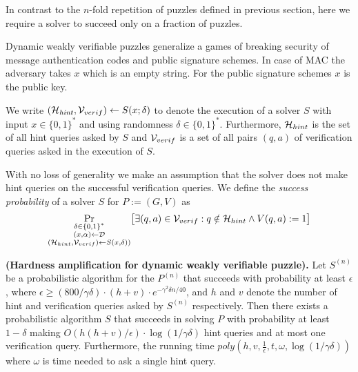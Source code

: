 In contrast to the $n$-fold repetition of puzzles defined in previous section, here we
require a solver to succeed only on a fraction of puzzles.

Dynamic weakly verifiable puzzles generalize a games of breaking security of message authentication codes and public signature schemes.
In case of MAC the adversary takes $x$ which is an empty string. For the public signature schemes $x$ is the public key.

We write $(\mathcal{H}_{\mathit{hint}}, \mathcal{V}_{verif}) \leftarrow S(x; \delta)$
to denote the execution of a solver $S$ with input $x \in \{0,1\}^{*}$ and using randomness $\delta \in \{0,1\}^{*}$.
Furthermore, $\mathcal{H}_{hint}$ is the set of all hint queries asked by $S$ and $\mathcal{V}_{verif}$ is
a set of all pairs $(q,a)$ of verification queries asked in the execution of $S$.

With no loss of generality we make an assumption that the solver does not make
hint queries on the successful verification queries.
We define the \textit{success probability} of a solver $S$ for $P := (G,V)$ as
\begin{align*}
  \underset{\substack{\delta \in \{0,1\}^{*} \\(x,\alpha) \leftarrow \mathcal{D} \\ (\mathcal{H}_{hint}, \mathcal{V}_{verif}) \leftarrow S(x,\delta))}}
  {\Pr}\big[\exists (q,a) \in \mathcal{V}_{verif} : q \notin \mathcal{H}_{hint} \land V(q,a) := 1 \big]
\end{align*}

\begin{theorem}\textbf{(Hardness amplification for dynamic weakly verifiable puzzle).}
\label{lemma:dwvp}
Let $S^{(n)}$ be a probabilistic algorithm for the $P^{(n)}$ that succeeds with
probability at least $\epsilon$, where $\epsilon \geq (800/\gamma\delta) \cdot (h+v) \cdot e^{-\gamma^2\delta n/40}$, and $h$ and $v$
denote the number of hint and verification queries asked by $S^{(n)}$ respectively.
Then there exists a probabilistic algorithm $S$ that succeeds in solving $P$ with probability at least
$1-\delta$ making $O(h(h+v)/\epsilon) \cdot \log(1/\gamma\delta)$ hint queries and at most one verification query.
Furthermore, the running time $\mathit{poly}(h,v,\frac{1}{\epsilon}, t, \omega, \log(1/\gamma\delta))$ where
$\omega$ is time needed to ask a single hint query.
\end{theorem}

